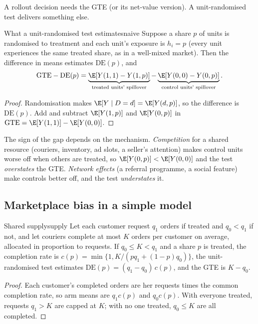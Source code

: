 \documentclass[11pt]{article}
\begin{document}
A rollout decision needs the GTE (or its net-value version). A unit-randomised test delivers something else.

\begin{prop}{What a unit-randomised test estimates}{naive}
Suppose a share $p$ of units is randomised to treatment and each unit's exposure is $h_i = p$ (every unit
experiences the same treated share, as in a well-mixed market). Then the difference in means estimates
$\text{DE}(p)$, and
\[
  \text{GTE} - \text{DE}(p) = \underbrace{\E[Y(1,1) - Y(1,p)]}_{\text{treated units' spillover}} - \underbrace{\E[Y(0,0) - Y(0,p)]}_{\text{control units' spillover}} .
\]
\end{prop}
\begin{proof}
Randomisation makes $\E[Y \mid D=d] = \E[Y(d,p)]$, so the difference is $\text{DE}(p)$. Add and subtract
$\E[Y(1,p)]$ and $\E[Y(0,p)]$ in $\text{GTE} = \E[Y(1,1)] - \E[Y(0,0)]$.
\end{proof}

The sign of the gap depends on the mechanism. \emph{Competition} for a shared resource (couriers, inventory, ad
slots, a seller's attention) makes control units worse off when others are treated, so $\E[Y(0,p)] < \E[Y(0,0)]$ and
the test \emph{overstates} the GTE. \emph{Network effects} (a referral programme, a social feature) make controls
better off, and the test \emph{understates} it.

\subsection{Marketplace bias in a simple model}

\begin{prop}{Shared supply}{supply}
Let each customer request $q_1$ orders if treated and $q_0 < q_1$ if not, and let couriers complete at most $K$ orders
per customer on average, allocated in proportion to requests. If $q_0 \le K < q_1$ and a share $p$ is treated, the
completion rate is $c(p) = \min\{1, K/(pq_1 + (1-p)q_0)\}$, the unit-randomised test estimates
$\text{DE}(p) = (q_1 - q_0)\,c(p)$, and the GTE is $K - q_0$.
\end{prop}
\begin{proof}
Each customer's completed orders are her requests times the common completion rate, so arm means are $q_1c(p)$ and
$q_0c(p)$. With everyone treated, requests $q_1 > K$ are capped at $K$; with no one treated, $q_0 \le K$ are all
completed.
\end{proof}
\end{document}
